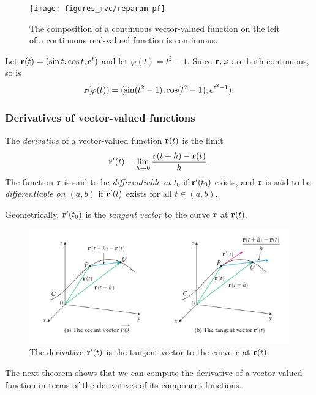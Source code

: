 \documentclass[12pt,letterpaper,reqno]{article}
\numberwithin{equation}{section}
\newcommand{\bbr}{{\bf r}}
\begin{document}
{\begin{figure}[h]
	\begin{center}
		\texttt{[image: figures\_mvc/reparam-pf]}
	\end{center}
	\caption{The composition of a continuous vector-valued function on the left of a continuous real-valued function is continuous.}
\end{figure}

\newpage

\begin{example}
Let $\bbr(t)=(\sin t,\cos t,e^t)$ and let $\varphi(t)=t^2-1$. Since $\bbr, \varphi$ are both continuous, so is
\begin{align*}
	\bbr(\varphi(t))=(\sin (t^2-1),\cos (t^2-1),e^{t^2-1}).
\end{align*}	
\end{example}


\subsubsection{Derivatives of vector-valued functions}
\begin{defn}
	The \emph{derivative} of a vector-valued function $\bbr(t)$ is the limit
	\begin{align*}
		\bbr'(t)=\lim_{h \to 0}\frac{\bbr(t+h)-\bbr(t)}{h}.
	\end{align*}
	The function $\bbr$ is said to be \emph{differentiable at $t_0$} if $\bbr'(t_0)$ exists, and $\bbr$ is said to be \emph{differentiable on $(a,b)$} if $\bbr'(t)$ exists for all $t \in (a,b)$.
\end{defn}
Geometrically, $\bbr'(t_0)$ is the \emph{tangent vector} to the curve $\bbr$ at $\bbr(t)$.

\begin{figure}[h]
	\begin{center}
	\includegraphics[scale=0.4]{figures_mvc/tangent_vector_secant_vector}
\end{center}
\caption{The derivative $\bbr'(t)$ is the tangent vector to the curve $\bbr$ at $\bbr(t)$.}
\end{figure}
The next theorem shows that we can compute the derivative of a vector-valued function in terms of the derivatives of its component functions.

}
\end{document}

